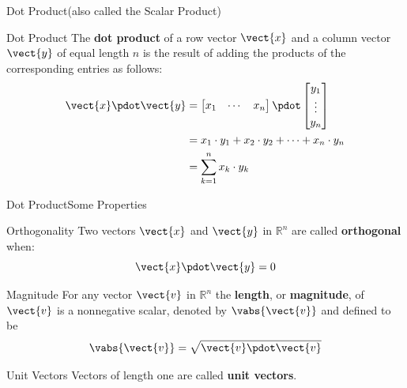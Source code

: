 \documentclass{beamer}
\begin{document}
\begin{frame}{Dot Product}{(also called the Scalar Product)}
\begin{block}{Dot Product}
The \textbf{dot product} of a row vector $\vect{x}$ and a column vector $\vect{y}$ of equal length $n$ is the result of adding the products of the corresponding entries as follows:
\begin{equation*}
\begin{split}
\vect{x}\pdot\vect{y}&=\begin{bmatrix}x_1&\cdots&x_n\end{bmatrix}\pdot
\begin{bmatrix}y_1\\\vdots\\y_n\end{bmatrix}\\
&=x_1\cdot y_1+x_2\cdot y_2+\cdots +x_n\cdot y_n\\
&=\sum_{k=1}^{n} x_k\cdot y_k
\end{split}
\end{equation*}
\end{block}
\end{frame}

\begin{frame}{Dot Product}{Some Properties}
\begin{block}{Orthogonality}
Two vectors $\vect{x}$ and $\vect{y}$ in $\mathbb{R}^n$ are called \textbf{orthogonal} when:
\begin{equation*}
\vect{x}\pdot\vect{y}=0
\end{equation*}
\end{block}\pause
\begin{block}{Magnitude}
For any vector $\vect{v}$ in $\mathbb{R}^n$ the \textbf{length}, or \textbf{magnitude}, of $\vect{v}$ is a nonnegative scalar, denoted by $\vabs{\vect{v}}$ and defined to be
\begin{equation*}
\vabs{\vect{v}}=\sqrt{\vect{v}\pdot \vect{v}}
\end{equation*}
\end{block}\pause
\begin{block}{Unit Vectors}
Vectors of length one are called \textbf{unit vectors}.
\end{block}
\end{frame}
\end{document}
